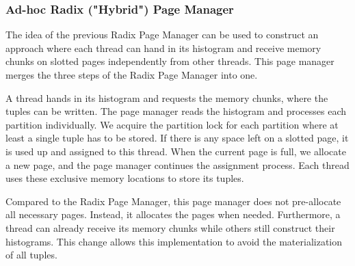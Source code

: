 \subsubsection{Ad-hoc Radix ("Hybrid") Page Manager} \label{subsubsection-Ad-hoc-Radix-Page-Manager}
The idea of the previous Radix Page Manager can be used to construct an approach where each thread can hand in its histogram and receive memory chunks on slotted pages independently from other threads.
This page manager merges the three steps of the Radix Page Manager into one.

A thread hands in its histogram and requests the memory chunks, where the tuples can be written.
The page manager reads the histogram and processes each partition individually.
We acquire the partition lock for each partition where at least a single tuple has to be stored.
If there is any space left on a slotted page, it is used up and assigned to this thread.
When the current page is full, we allocate a new page, and the page manager continues the assignment process.
Each thread uses these exclusive memory locations to store its tuples.

Compared to the Radix Page Manager, this page manager does not pre-allocate all necessary pages.
Instead, it allocates the pages when needed.
Furthermore, a thread can already receive its memory chunks while others still construct their histograms.
This change allows this implementation to avoid the materialization of all tuples.
